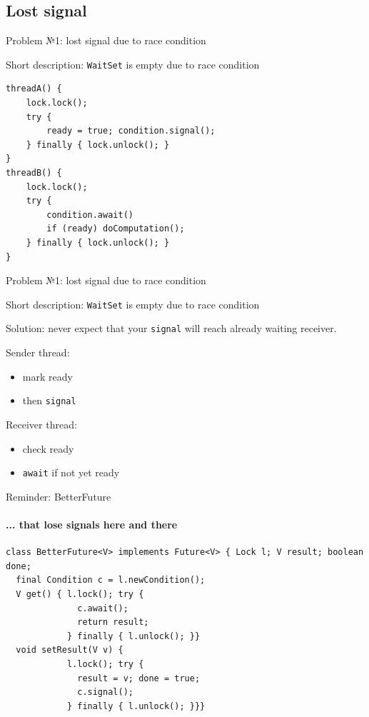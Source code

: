 \subsection{Lost signal}
\showTOCSub

\begin{frame}[t, fragile]{Problem №1: lost signal due to race condition}

Short description: \texttt{WaitSet} is empty due to race condition

\begin{verbatim}
threadA() {
    lock.lock();
    try {
        ready = true; condition.signal();
    } finally { lock.unlock(); }
}
threadB() {
    lock.lock();
    try {
        condition.await()
        if (ready) doComputation();
    } finally { lock.unlock(); }
}
\end{verbatim}
\end{frame}


\begin{frame}{Problem №1: lost signal due to race condition}

Short description: \texttt{WaitSet} is empty due to race condition

Solution: never expect that your \texttt{signal} will reach already waiting receiver. 

Sender thread:
\begin{itemize}
    \item mark ready
    \item then \texttt{signal}
\end{itemize}

Receiver thread:
\begin{itemize}
    \item check ready
    \item \texttt{await} if not yet ready
\end{itemize}
\end{frame}


\begin{frame}[t,fragile]{Reminder: BetterFuture}
\framesubtitle{... that lose signals here and there}

\begin{verbatim}
class BetterFuture<V> implements Future<V> { Lock l; V result; boolean done;
  final Condition c = l.newCondition();
  V get() { l.lock(); try {
              c.await(); 
              return result; 
            } finally { l.unlock(); }}
  void setResult(V v) { 
            l.lock(); try { 
              result = v; done = true;
              c.signal();
            } finally { l.unlock(); }}}
\end{verbatim}
\end{frame}

